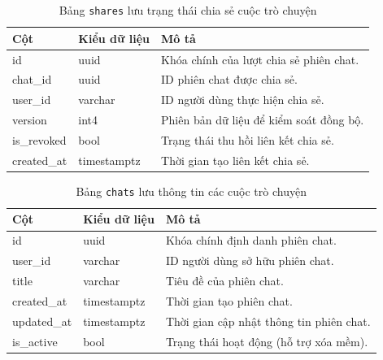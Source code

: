 \begin{table}[H]
\centering
\begin{tabular}{|l|l|p{6cm}|}
\hline
\textbf{Cột} & \textbf{Kiểu dữ liệu} & \textbf{Mô tả} \\ \hline
id & uuid & Khóa chính của lượt chia sẻ phiên chat. \\ \hline
chat\_id & uuid & ID phiên chat được chia sẻ. \\ \hline
user\_id & varchar & ID người dùng thực hiện chia sẻ. \\ \hline
version & int4 & Phiên bản dữ liệu để kiểm soát đồng bộ. \\ \hline
is\_revoked & bool & Trạng thái thu hồi liên kết chia sẻ. \\ \hline
created\_at & timestamptz & Thời gian tạo liên kết chia sẻ. \\ \hline
\end{tabular}
\caption{Bảng \texttt{shares} lưu trạng thái chia sẻ cuộc trò chuyện}
\end{table}

\begin{table}[H]
\centering
\begin{tabular}{|l|l|p{6cm}|}
\hline
\textbf{Cột} & \textbf{Kiểu dữ liệu} & \textbf{Mô tả} \\ \hline
id & uuid & Khóa chính định danh phiên chat. \\ \hline
user\_id & varchar & ID người dùng sở hữu phiên chat. \\ \hline
title & varchar & Tiêu đề của phiên chat. \\ \hline
created\_at & timestamptz & Thời gian tạo phiên chat. \\ \hline
updated\_at & timestamptz & Thời gian cập nhật thông tin phiên chat. \\ \hline
is\_active & bool & Trạng thái hoạt động (hỗ trợ xóa mềm). \\ \hline
\end{tabular}
\caption{Bảng \texttt{chats} lưu thông tin các cuộc trò chuyện}
\end{table}

